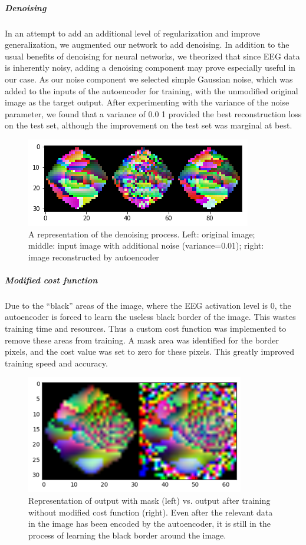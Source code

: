 \documentclass{article}
\begin{document}
\subparagraph{Denoising}
In an attempt to add an additional level of regularization and improve generalization, we augmented our network to add denoising. In addition to the usual benefits of denoising for neural networks, we theorized that since EEG data is inherently noisy, adding a denoising component may prove especially useful in our case. As our noise component we selected simple Gaussian noise, which was added to the inputs of the autoencoder for training, with the unmodified original image as the target output. After experimenting with the variance of the noise parameter, we found that a variance of 0.0 1 provided the best reconstruction loss on the test set, although the improvement on the test set was marginal at best. 
\begin{figure}
\includegraphics{denoising}
\caption{A representation of the denoising process. Left: original image; middle: input image with additional noise (variance=0.01); right: image reconstructed by autoencoder}
\end{figure}
\subparagraph{Modified cost function}
Due to the “black” areas of the image, where the EEG activation level is 0, the autoencoder is forced to learn the useless black border of the image. This wastes training time and resources. Thus a custom cost function was implemented to remove these areas from training. A mask area was identified for the border pixels, and the cost value was set to zero for these pixels. This greatly improved training speed and accuracy.
\begin{figure}
\includegraphics{mask}
\caption{Representation of output with mask (left) vs. output after training without modified cost function (right). Even after the relevant data in the image has been encoded by the autoencoder, it is still in the process of learning the black border around the image.}
\end{figure}
\end{document}
